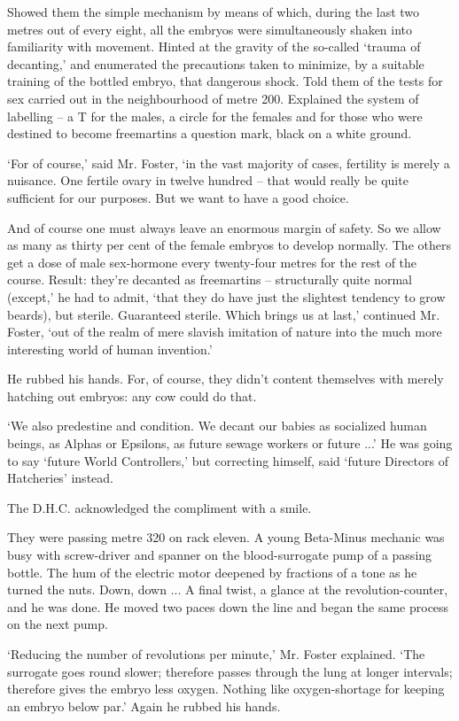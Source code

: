 \documentclass[10pt,a4paper]{article}
\newcommand{\sqm}[1]{‘#1’}
\begin{document}
Showed them the simple mechanism by means of which, during the last two metres out of every eight, all the embryos were simultaneously shaken into familiarity with movement. Hinted at the gravity of the so-called \sqm{trauma of decanting,} and enumerated the precautions taken to minimize, by a suitable training of the bottled embryo, that dangerous shock. Told them of the tests for sex carried out in the neighbourhood of metre 200. Explained the system of labelling – a T for the males, a circle for the females and for those who were destined to become freemartins a question mark, black on a white ground.

\sqm{For of course,} said Mr. Foster, \sqm{in the vast majority of cases, fertility is merely a nuisance. One fertile ovary in twelve hundred – that would really be quite sufficient for our purposes. But we want to have a good choice.

And of course one must always leave an enormous margin of safety. So we allow as many as thirty per cent of the female embryos to develop normally. The others get a dose of male sex-hormone every twenty-four metres for the rest of the course. Result: they're decanted as freemartins – structurally quite normal (except,} he had to admit, \sqm{that they do have just the slightest tendency to grow beards), but sterile. Guaranteed sterile. Which brings us at last,} continued Mr. Foster, \sqm{out of the realm of mere slavish imitation of nature into the much more interesting world of human invention.}

He rubbed his hands. For, of course, they didn't content themselves with merely hatching out embryos: any cow could do that.

\sqm{We also predestine and condition. We decant our babies as socialized human beings, as Alphas or Epsilons, as future sewage workers or future ...} He was going to say \sqm{future World Controllers,} but correcting himself, said \sqm{future Directors of Hatcheries} instead.

The D.H.C. acknowledged the compliment with a smile.

They were passing metre 320 on rack eleven. A young Beta-Minus mechanic was busy with screw-driver and spanner on the blood-surrogate pump of a passing bottle. The hum of the electric motor deepened by fractions of a tone as he turned the nuts. Down, down ... A final twist, a glance at the revolution-counter, and he was done. He moved two paces down the line and began the same process on the next pump.

\sqm{Reducing the number of revolutions per minute,} Mr. Foster explained. \sqm{The surrogate goes round slower; therefore passes through the lung at longer intervals; therefore gives the embryo less oxygen. Nothing like oxygen-shortage for keeping an embryo below par.} Again he rubbed his hands.
\end{document}

